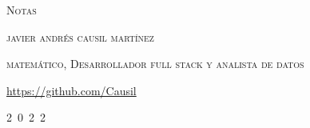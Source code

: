 \thispagestyle{empty}
\vspace*{0.5cm}
\begin{center}
	{\Large\scshape Notas\\[5pt] }
\end{center}


\vspace*{1cm}
\begin{center}
\end{center}

\vspace*{1cm}
\begin{center}
	{\Large\scshape  javier andr\'es causil mart\'inez}
\end{center}

\vspace*{2cm}
\begin{center}
	{\large\scshape matem\'atico, Desarrollador full stack y analista de datos\\ [3.pt]  }
\end{center}

\vspace*{2cm}
\begin{center}
	{\rm \url{https://github.com/Causil} }
\end{center}

\hfill
\begin{center}
	2\ 0\ 2\ 2
\end{center}
